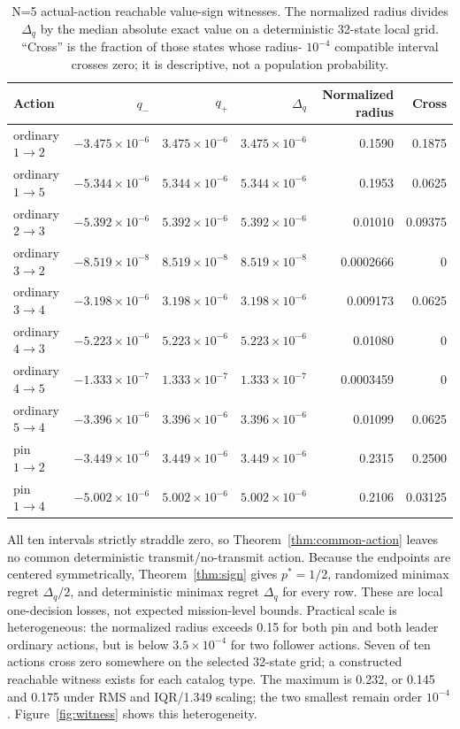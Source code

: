 \documentclass[10pt,twocolumn,twoside]{IEEEtran}
\begin{document}
\begin{table}[t]
\caption{N=5 actual-action reachable value-sign witnesses.  The normalized
radius divides \(\Delta_q\) by the median absolute exact value on a deterministic
32-state local grid. ``Cross'' is the fraction of those states whose radius-
\(10^{-4}\) compatible interval crosses zero; it is descriptive, not a
population probability.}
\label{tab:regret}
\centering
\scriptsize
\begin{tabular}{lrrrrr}
\toprule
Action & $q_-$ & $q_+$ & $\Delta_q$ & Normalized radius & Cross \\
\midrule
ordinary $1\to2$ & $-3.475\times10^{-6}$ & $3.475\times10^{-6}$ & $3.475\times10^{-6}$ & 0.1590 & 0.1875 \\
ordinary $1\to5$ & $-5.344\times10^{-6}$ & $5.344\times10^{-6}$ & $5.344\times10^{-6}$ & 0.1953 & 0.0625 \\
ordinary $2\to3$ & $-5.392\times10^{-6}$ & $5.392\times10^{-6}$ & $5.392\times10^{-6}$ & 0.01010 & 0.09375 \\
ordinary $3\to2$ & $-8.519\times10^{-8}$ & $8.519\times10^{-8}$ & $8.519\times10^{-8}$ & 0.0002666 & 0 \\
ordinary $3\to4$ & $-3.198\times10^{-6}$ & $3.198\times10^{-6}$ & $3.198\times10^{-6}$ & 0.009173 & 0.0625 \\
ordinary $4\to3$ & $-5.223\times10^{-6}$ & $5.223\times10^{-6}$ & $5.223\times10^{-6}$ & 0.01080 & 0 \\
ordinary $4\to5$ & $-1.333\times10^{-7}$ & $1.333\times10^{-7}$ & $1.333\times10^{-7}$ & 0.0003459 & 0 \\
ordinary $5\to4$ & $-3.396\times10^{-6}$ & $3.396\times10^{-6}$ & $3.396\times10^{-6}$ & 0.01099 & 0.0625 \\
pin $1\to2$ & $-3.449\times10^{-6}$ & $3.449\times10^{-6}$ & $3.449\times10^{-6}$ & 0.2315 & 0.2500 \\
pin $1\to4$ & $-5.002\times10^{-6}$ & $5.002\times10^{-6}$ & $5.002\times10^{-6}$ & 0.2106 & 0.03125 \\
\bottomrule
\end{tabular}
\end{table}

All ten intervals strictly straddle zero, so
Theorem~\ref{thm:common-action} leaves no common deterministic
transmit/no-transmit action.  Because the endpoints are centered symmetrically,
Theorem~\ref{thm:sign} gives
\(p^*=1/2\), randomized minimax regret \(\Delta_q/2\), and deterministic
minimax regret \(\Delta_q\) for every row.  These are local one-decision losses,
not expected mission-level bounds.  Practical scale is heterogeneous: the
normalized radius exceeds 0.15 for both pin and both leader ordinary actions,
but is below \(3.5\times10^{-4}\) for two follower actions.  Seven of ten
actions cross zero somewhere on the selected 32-state grid; a constructed
reachable witness exists for each catalog type.  The maximum is 0.232, or
0.145 and 0.175 under RMS and IQR/1.349 scaling; the two smallest remain
order \(10^{-4}\).  Figure~\ref{fig:witness} shows this heterogeneity.
\end{document}
